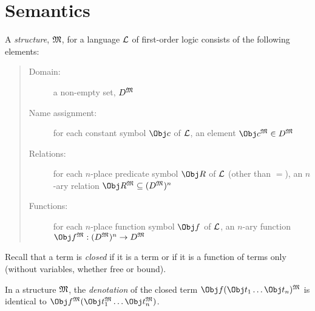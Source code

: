 \documentclass[syntax-and-semantics]{subfiles}
\begin{document}
\section{Semantics}




\begin{defn}[Structure]
A \emph{structure}, $\mathfrak{M}$, for a language $\mathcal{L}$ of first-order logic consists of the following elements:
\begin{quote}
\begin{description}
\item[Domain:] a non-empty set, $D^\mathfrak{M}$ 
\item[Name assignment:] for each constant symbol $\Obj c$ of $\mathcal{L}$, an element $\Obj c^\Struct{M} \in D^\Struct{M}$
\item[Relations:] for each $n$-place predicate symbol $\Obj R$ of $\mathcal{L}$ (other than $=$), an $n$-ary relation $\Obj R^\Struct{M} \subseteq (D^\Struct{M})^n$
\item[Functions:] for each $n$-place function symbol $\Obj f$ of $\mathcal{L}$, an $n$-ary function $\Obj f^\Struct{M} : (D^\Struct{M})^n \rightarrow D^\Struct{M}$

\end{description}
\end{quote}
\end{defn}

\begin{wordy}
Recall that a term is \emph{closed} if it is a term or if it is a function of terms only (without variables, whether free or bound).
\end{wordy}

\begin{defn}
In a structure $\mathfrak{M}$, the \emph{denotation} of the closed term $\Obj f(\Obj t_1 \ldots \Obj t_n)^\Struct{M}$ is identical to $\Obj f^\Struct{M}(\Obj t_1^\Struct{M} \ldots \Obj t_n^\Struct{M})$. 
\end{defn}
\end{document}
